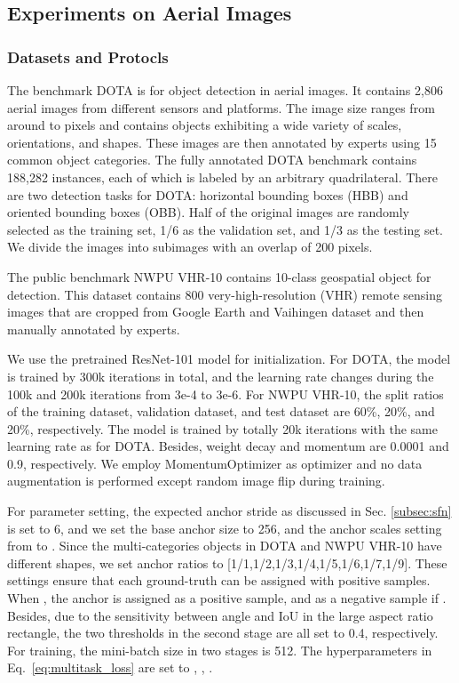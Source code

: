 \documentclass[10pt,twocolumn,letterpaper]{article}
\begin{document}
	
	\subsection{Experiments on Aerial Images}
\subsubsection{Datasets and Protocls}
	The benchmark DOTA \cite{xia2018dota} is for object detection in aerial images. It contains 2,806 aerial images from different sensors and platforms. The image size ranges from around  to  pixels and contains objects exhibiting a wide variety of scales, orientations, and shapes. These images are then annotated by experts using 15 common object categories. The fully annotated DOTA benchmark contains 188,282 instances, each of which is labeled by an arbitrary quadrilateral. There are two detection tasks for DOTA: horizontal bounding boxes (HBB) and oriented bounding boxes (OBB). Half of the original images are randomly selected as the training set, 1/6 as the validation set, and 1/3 as the testing set. We divide the images into  subimages with an overlap of 200 pixels.
	
	The public benchmark NWPU VHR-10 \cite{cheng2016learning} contains 10-class geospatial object for detection. This dataset contains 800 very-high-resolution (VHR) remote sensing images that are cropped from Google Earth and Vaihingen dataset and then manually annotated by experts.
	
	We use the pretrained ResNet-101 model for initialization. For DOTA, the model is trained by 300k iterations in total, and the learning rate changes during the 100k and 200k iterations from 3e-4 to 3e-6. For NWPU VHR-10, the split ratios of the training dataset, validation dataset, and test dataset are 60\%, 20\%, and 20\%, respectively. The model is trained by totally 20k iterations with the same learning rate as for DOTA. Besides, weight decay and momentum are 0.0001 and 0.9, respectively. We employ MomentumOptimizer as optimizer and no data augmentation is performed except random image flip during training. 

	
	For parameter setting, the expected anchor stride  as discussed in Sec. \ref{subsec:sfn} is set to 6, and we set the base anchor size to 256, and the anchor scales setting from  to . Since the multi-categories objects in DOTA and NWPU VHR-10 have different shapes, we set anchor ratios to [1/1,1/2,1/3,1/4,1/5,1/6,1/7,1/9]. These settings ensure that each ground-truth can be assigned with positive samples. When , the anchor is assigned as a positive sample, and as a negative sample if . Besides, due to the sensitivity between angle and IoU in the large aspect ratio rectangle, the two thresholds in the second stage are all set to 0.4, respectively. For training, the mini-batch size in two stages is 512. The hyperparameters in Eq.~\ref{eq:multitask_loss} are set to , , .
\end{document}

